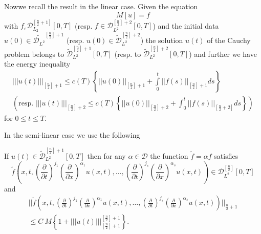 Now\pageoriginale we recall the result in the linear case. Given the
equation 
\begin{equation*}
M[u]= f \tag{5.4}\label{chap5-eq5.4}
\end{equation*}
with $f_\varepsilon \mathscr{D}^{\left[\frac{n}{2}+1\right]}_{L_2} [ 0, T]$
(resp. $f \in \mathscr{D}^{\left[\frac{n}{2}\right]+2}_{L^2} [0, T]$)
and the initial data $ u(0) \in
\tilde{\mathscr{D}_{L^2}}^{\left[\frac{n}{2}\right]+1}$ (resp. $u(0)
\in  
\tilde{\mathscr{D}}^{\left[\frac{n}{2}\right]+2}_{L^2}$) the solution
$u(t)$ of the Cauchy problem belongs to
$\tilde{\mathscr{D}}^{\left[\frac{n}{2}\right]+1}_{L^2} [0,T]$
(resp. to 
$\tilde{\mathscr{D}}^{\left[\frac{n}{2}\right]+2}_{L^2} [0,T]$) and further
we have the energy inequality  
\begin{gather*}
||| u(t)|||_{\left[\frac{n}{2}\right]+1}  \leq c(T) \left\{ || u(0)
||_{\left[\frac{n}{2}\right]+1} + \int\limits^t_0 || f(s)
||_{\left[\frac{n}{2}\right]+1} 
ds \right\}\\ 
\left(\text{resp. } ||| u(t) |||_{\left[\frac{n}{2}\right]+2}  \leq  c(T)
\left\{||u(0) ||_{\left[\frac{n}{2} \right]+2} + \int^t_0 ||f(s)
||_{[\frac{n}{2}+2]}ds\right\}\right)  
\end{gather*}
for $0 \leq t \leq T$.

In the semi-linear case we use the following 

\setcounter{lemma}{0}
\begin{lemma}\label{chap5-sec5-lem1}%
If $u(t) \in \tilde{\mathscr{D}}^{\left[\frac{n}{2}
     \right]+1}_{L^2} [0,T]$ then for any $ \alpha \in
 \mathscr{D}$ the function  $\tilde{f}= \alpha f$ satisfies   
 $$
  \tilde{f}\left(x,t, \left(\frac{\partial}{\partial t}\right)^{j_1}
 \left(\frac{\partial}{\partial x}\right)^{\alpha_1} u(x, t), \ldots,
 \left(\frac{\partial}{\partial t}\right)^{j_s}\left(\frac{\partial}{\partial
   x}\right)^{\alpha_s} u(x, t)\right)
 \in{\mathscr{D}}^{\left[\frac{n}{2} \right]}_{L^2} [0,T] 
 $$
 and
 \begin{gather*}
|| \tilde{f}(x, t, \left(\frac{\partial}{\partial
  t}\right)^{j_1}\left(\frac{\partial}{\partial x}\right)^{\alpha_1}
u(x, t), \ldots, 
\left(\frac{\partial}{\partial t}\right)^{j_s}\left(\frac{\partial}{\partial
  x}\right)^{\alpha_s} u(x, t)) ||_{\frac{n}{2}+1} \\ 
\leq  C ~M \left\{ 1+ |||
u(t)|||^{\left[\frac{n}{2}\right]+1}_{\left[\frac{n}{2}\right]+1}\right\}.
 \tag{5.5} \label{chap5-eq5.5}   
 \end{gather*} 
\end{lemma}

